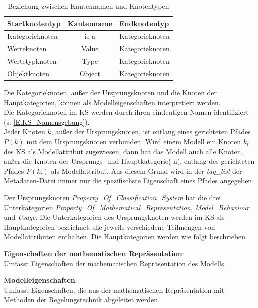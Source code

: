\begin{table}[H]
	\centering
	\begin{tabular}{l|c|l}
		Startknotentyp & Kantenname & Endknotentyp \\ \hline
		Kategorieknoten & is a & Kategorieknoten \\
		Werteknoten & Value & Kategorieknoten \\
		Wertetypknoten & Type & Kategorieknoten \\
		Objektknoten & Object & Kategorieknoten
	\end{tabular}
	\caption{Beziehung zwischen Kantennamen und Knotentypen}
	\label{table:KS_KantenUndKnoten}
\end{table}
%
Die Kategorieknoten, außer der Ursprungsknoten und die Knoten der Hauptkategorien, können als Modelleigenschaften interpretiert werden. \\
Die Kategorieknoten im KS werden durch ihren eindeutigen Namen identifiziert (s. \autoref{E.KS_Namensgebung}).\\
Jeder Knoten $k$, außer der Ursprungsknoten, ist entlang eines gerichteten Pfades $P(k)$ mit dem Ursprungsknoten verbunden. Wird einem Modell ein Knoten $k_i$ des KS als Modellattribut zugewiesen, dann hat das Modell auch alle Knoten, außer die Knoten der Ursprungs -und Hauptkategorie(-n), entlang des gerichteten Pfades $P(k_i)$ als Modellattribut. Aus diesem Grund wird in der \textit{tag\_list} der Metadaten-Datei immer nur die spezifischste Eigenschaft eines Pfades angegeben. %

Der Ursprungsknoten \textit{Property\_Of\_Classification\_System} hat die drei Unterkategorien \textit{Property\_Of\_Mathematical\_Representation}, \textit{Model\_Behaviour} und \textit{Usage}. Die Unterkategorien des Ursprungsknoten werden im KS als Hauptkategorien bezeichnet, die jeweils verschiedene Teilmengen von Modellattributen enthalten. Die Hauptkategorien werden wie folgt beschrieben.

\textbf{Eigenschaften der mathematischen Repräsentation}: \\
Umfasst Eigenschaften der mathematischen Repräsentation des Modells.   %

\textbf{Modelleigenschaften}: \\ %
Umfasst Eigenschaften, die aus der mathematischen Repräsentation mit Methoden der Regelungstechnik abgeleitet werden.

